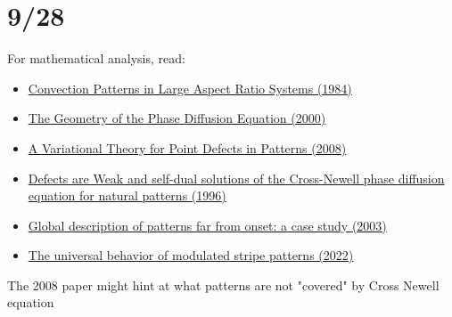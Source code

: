 \documentclass[12pt]{article}
\newcounter{solution}
\begin{document}
\section{9/28}
For mathematical analysis, read:
\begin{itemize}
\item \href{https://reader.elsevier.com/reader/sd/pii/0167278984901817?token=4D223BF072CC8BC8B10B898BAD413C5321ECECB3ED3BD955E230D070B9EF199217ECA027EB81D62E06F291D11DC1F6BF&originRegion=us-east-1&originCreation=20220928193234}{Convection Patterns in Large Aspect Ratio Systems (1984)}
\item \href{https://www.math.arizona.edu/~anewell/publications/Geometry_Phase_Diffusion_Eq.pdf}{The Geometry of the Phase Diffusion Equation (2000)}
\item \href{https://link-springer-com.ezproxy2.library.arizona.edu/content/pdf/10.1007/s00332-008-9035-9.pdf}{A Variational Theory for Point Defects in Patterns (2008)}
\item \href{https://reader.elsevier.com/reader/sd/pii/0167278996000735?token=7B13D427DB6F1344FB2FB30E3AB40BF19A94D5978773B0B404E981CE661E13AF2D09A29C84928DDB4DE9CAD7FA3CB105&originRegion=us-east-1&originCreation=20220928200316}{Defects are Weak and self-dual solutions of the Cross-Newell phase diffusion equation for natural patterns (1996)}
\item \href{https://reader.elsevier.com/reader/sd/pii/S0167278903002173?token=0D059631EB67C2E045F7E0D8F5815A75F9E0F5CE3CB817BE1D86B644AC91459ECF4B68E044F6787CB80290A8A6451C65&originRegion=us-east-1&originCreation=20220928200420}{Global description of patterns far from onset: a case study (2003)}
\item \href{https://www.cmu.edu/cee/convergence/preprints/UniversalBehaviorModulatedStripePatterns.pdf}{The universal behavior of modulated stripe patterns (2022)}
\end{itemize}
The 2008 paper might hint at what patterns are not "covered" by Cross Newell equation
\end{document}
